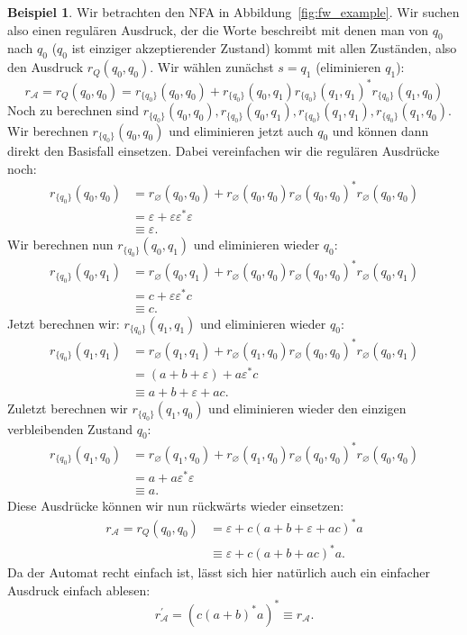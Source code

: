\documentclass[11pt, a4paper]{article}
\theoremstyle{definition}
\newtheorem{example}[definition]{Beispiel}
\theoremstyle{plain}
\numberwithin{equation}{section}
\let\emptyset\varnothing
\begin{document}
\begin{example}\label{exp:fw_example}
	Wir betrachten den NFA in Abbildung~\ref{fig:fw_example}. Wir suchen also einen regulären Ausdruck, der die Worte beschreibt mit denen man von $q_0$ nach $q_0$ ($q_0$ ist einziger akzeptierender Zustand) kommt mit allen Zuständen, also den Ausdruck $r_Q(q_0, q_0)$. Wir wählen zunächst $s = q_1$ (eliminieren $q_1$):
	$$
		r_\mathcal{A} = r_Q(q_0, q_0) = r_{\{ q_0 \}}(q_0, q_0) + r_{\{ q_0 \}}(q_0, q_1) r_{\{ q_0 \}}(q_1, q_1)^\ast r_{\{ q_0 \}}(q_1, q_0)
	$$
	Noch zu berechnen sind $r_{\{ q_0 \}}(q_0, q_0), r_{\{ q_0 \}}(q_0, q_1), r_{\{ q_0 \}}(q_1, q_1), r_{\{ q_0 \}}(q_1, q_0)$. Wir berechnen $r_{\{ q_0 \}}(q_0, q_0)$ und eliminieren jetzt auch $q_0$ und können dann direkt den Basisfall einsetzen. Dabei vereinfachen wir die regulären Ausdrücke noch:
	\begin{align*}
		r_{\{ q_0 \}}(q_0, q_0) &= r_\emptyset(q_0, q_0) + r_\emptyset(q_0, q_0) r_\emptyset(q_0, q_0)^\ast r_\emptyset(q_0, q_0)\\
		&= \varepsilon + \varepsilon \varepsilon^\ast \varepsilon\\
		&\equiv \varepsilon.
	\end{align*}
	Wir berechnen nun $r_{\{ q_0 \}}(q_0, q_1)$ und eliminieren wieder $q_0$:
	\begin{align*}
		r_{\{ q_0 \}}(q_0, q_1) &= r_\emptyset(q_0, q_1) + r_\emptyset(q_0, q_0) r_\emptyset(q_0, q_0)^\ast r_\emptyset(q_0, q_1)\\
		&= c + \varepsilon \varepsilon^\ast c\\
		&\equiv c.
	\end{align*}
	Jetzt berechnen wir: $r_{\{ q_0 \}}(q_1, q_1)$ und eliminieren wieder $q_0$:
	\begin{align*}
		r_{\{ q_0 \}}(q_1, q_1) &= r_\emptyset(q_1, q_1) + r_\emptyset(q_1, q_0) r_\emptyset(q_0, q_0)^\ast r_\emptyset(q_0, q_1)\\
		&= (a + b + \varepsilon) + a \varepsilon^\ast c\\
		&\equiv a + b + \varepsilon + ac.
	\end{align*}
	Zuletzt berechnen wir $r_{\{ q_0 \}}(q_1, q_0)$ und eliminieren wieder den einzigen verbleibenden Zustand $q_0$:
	\begin{align*}
		r_{\{ q_0 \}}(q_1, q_0) &= r_\emptyset(q_1, q_0) + r_\emptyset(q_1, q_0) r_\emptyset(q_0, q_0)^\ast r_\emptyset(q_0, q_0)\\
		&= a + a \varepsilon^\ast \varepsilon\\
		&\equiv a.
	\end{align*}
	Diese Ausdrücke können wir nun rückwärts wieder einsetzen:
	\begin{align*}
		r_\mathcal{A} = r_Q(q_0, q_0) &= \varepsilon + c (a + b + \varepsilon + ac)^\ast  a\\
		&\equiv \varepsilon + c(a+b+ac)^\ast a.
	\end{align*}
	Da der Automat recht einfach ist, lässt sich hier natürlich auch ein einfacher Ausdruck einfach ablesen:
	$$
		r_\mathcal{A}^\prime = (c (a+b)^\ast a)^\ast \equiv r_\mathcal{A}.
	$$
\end{example}
\end{document}
